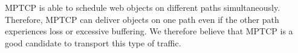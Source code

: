 MPTCP is able to schedule web objects on different paths simultaneously. Therefore, MPTCP can deliver objects on one path even if the other path
experiences loss or excessive buffering. We therefore believe that MPTCP is a good candidate to transport this type of traffic.



